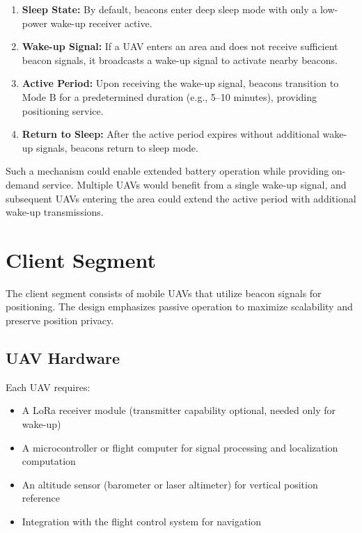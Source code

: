 \documentclass[master,final,11pt]{iscs-thesis}
\begin{document}
\begin{enumerate}
    \item \textbf{Sleep State:} By default, beacons enter deep sleep mode with only a low-power wake-up receiver active.
    
    \item \textbf{Wake-up Signal:} If a UAV enters an area and does not receive sufficient beacon signals, it broadcasts a wake-up signal to activate nearby beacons.
    
    \item \textbf{Active Period:} Upon receiving the wake-up signal, beacons transition to Mode B for a predetermined duration (e.g., 5--10 minutes), providing positioning service.
    
    \item \textbf{Return to Sleep:} After the active period expires without additional wake-up signals, beacons return to sleep mode.
\end{enumerate}

Such a mechanism could enable extended battery operation while providing on-demand service.
Multiple UAVs would benefit from a single wake-up signal, and subsequent UAVs entering the area could extend the active period with additional wake-up transmissions.

\section{Client Segment}
\label{sec:client_segment}

The client segment consists of mobile UAVs that utilize beacon signals for positioning.
The design emphasizes passive operation to maximize scalability and preserve position privacy.

\subsection{UAV Hardware}

Each UAV requires:
\begin{itemize}
    \item A LoRa receiver module (transmitter capability optional, needed only for wake-up)
    \item A microcontroller or flight computer for signal processing and localization computation
    \item An altitude sensor (barometer or laser altimeter) for vertical position reference
    \item Integration with the flight control system for navigation
\end{itemize}
\end{document}
